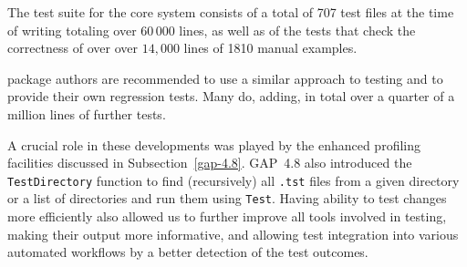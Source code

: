 The \GAP test
suite for the core system consists of a total of 707 test files at the time of writing
totaling over $60\,000$ lines,
as well as of the tests that check the correctness of over
over $14,000$ lines of 1810 manual examples.
%

\GAP package authors are recommended to 
use a similar approach to testing and to provide their own regression
tests. Many do, adding, in total over a quarter of a million lines of
further tests.

A crucial role in these developments was played by the enhanced
profiling facilities discussed 
in Subsection~\ref{gap-4.8}. 
GAP~4.8 also introduced the {\tt TestDirectory} function to find
(recursively) all {\tt .tst} files from a given directory or a list of 
directories and run them using {\tt Test}. Having ability to test
changes more efficiently also allowed us to further improve all 
tools involved in testing, making their output more informative,
and allowing test integration into various automated workflows
by a better detection of the test outcomes. %


